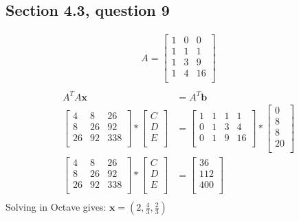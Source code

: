 \documentclass[a4paper,11pt]{article}
\newcommand{\mybf}[1]{\boldsymbol{#1}}
\begin{document}
\subsection*{Section 4.3, question 9}
\begin{align*}
A = 
\begin{bmatrix}
1 & 0 & 0\\
1 & 1 & 1\\
1 & 3 & 9\\
1 & 4 & 16\\
\end{bmatrix} \\
\end{align*}
\begin{align*}
A^TA\mybf{x}&=A^T\mybf{b} \\
\begin{bmatrix}
4 & 8 & 26 \\
8 & 26 & 92\\
26 & 92 & 338\\
\end{bmatrix}
*
\begin{bmatrix}
C \\
D \\
E \\
\end{bmatrix}
&=
\begin{bmatrix}
1 & 1 & 1 & 1 \\
0 & 1 & 3 & 4 \\
0 & 1 & 9 & 16 \\
\end{bmatrix} 
*
\begin{bmatrix}
0 \\
8 \\
8 \\
20 \\
\end{bmatrix} \\
\begin{bmatrix}
4 & 8 & 26 \\
8 & 26 & 92\\
26 & 92 & 338\\
\end{bmatrix}
*
\begin{bmatrix}
C \\
D \\
E \\
\end{bmatrix}
&=
\begin{bmatrix}
36 \\
112 \\
400 \\
\end{bmatrix} \\
\end{align*}
Solving in Octave gives: $\mybf{x}=(2, \frac{4}{3}, \frac{2}{3})$
\end{document}
